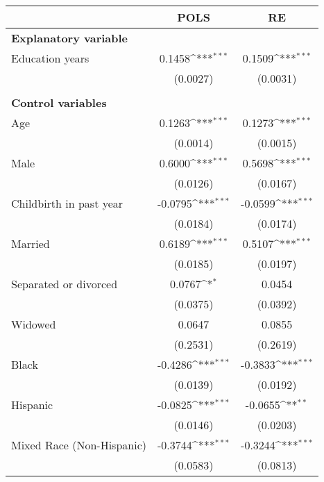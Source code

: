 {
\def\sym#1{\ifmmode^{#1}\else\(^{#1}\)\fi}
\begin{tabular}{l*{2}{c}}
\toprule
                    &\multicolumn{1}{c}{POLS}&\multicolumn{1}{c}{RE}\\
\midrule
\textbf{Explanatory variable}&                     &                     \\
Education years     &      0.1458\sym{***}&      0.1509\sym{***}\\
                    &    (0.0027)         &    (0.0031)         \\
\\ \textbf{Control variables}&                     &                     \\
Age                 &      0.1263\sym{***}&      0.1273\sym{***}\\
                    &    (0.0014)         &    (0.0015)         \\
Male                &      0.6000\sym{***}&      0.5698\sym{***}\\
                    &    (0.0126)         &    (0.0167)         \\
Childbirth in past year&     -0.0795\sym{***}&     -0.0599\sym{***}\\
                    &    (0.0184)         &    (0.0174)         \\
Married             &      0.6189\sym{***}&      0.5107\sym{***}\\
                    &    (0.0185)         &    (0.0197)         \\
Separated or divorced&      0.0767\sym{*}  &      0.0454         \\
                    &    (0.0375)         &    (0.0392)         \\
Widowed             &      0.0647         &      0.0855         \\
                    &    (0.2531)         &    (0.2619)         \\
Black               &     -0.4286\sym{***}&     -0.3833\sym{***}\\
                    &    (0.0139)         &    (0.0192)         \\
Hispanic            &     -0.0825\sym{***}&     -0.0655\sym{**} \\
                    &    (0.0146)         &    (0.0203)         \\
Mixed Race (Non-Hispanic)&     -0.3744\sym{***}&     -0.3244\sym{***}\\
                    &    (0.0583)         &    (0.0813)         \\

\end{tabular}}
